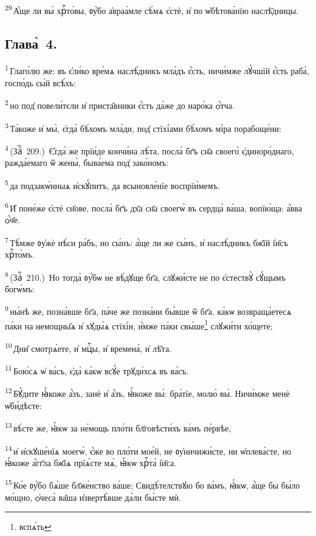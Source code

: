 \textsuperscript{29}\,А҆́ще ли вы̀ хрⷭ҇то́вы, ᲂу҆̀бо а҆враа́мле сѣ́мѧ є҆стѐ, и҆ по ѡ҆бѣтова́нїю наслѣ̑дницы.

\subsection{Глава̀~4.}

\textsuperscript{1}\,Глаго́лю же: въ є҆ли́ко вре́мѧ наслѣ́дникъ мла́дъ є҆́сть, ничи́мже лꙋ́чшїй є҆́сть раба̀, госпо́дь сы́й всѣ́хъ:

\textsuperscript{2}\,но под̾ повели́тєли и҆ приста̑вники є҆́сть да́же до наро́ка ѻ҆́тча.

\textsuperscript{3}\,Та́коже и҆ мы̀, є҆гда̀ бѣ́хомъ мла́ди, под̾ стїхі́ами бѣ́хомъ мі́ра порабоще́ни:

\textsuperscript{4}\,(Заⷱ҇~209.)~Є҆гда́ же прїи́де кончи́на лѣ́та, посла̀ бг҃ъ сн҃а своего̀ є҆диноро́днаго, ражда́емаго ѿ жены̀, быва́ема под̾ зако́номъ:

\textsuperscript{5}\,да подзакѡ́нныѧ и҆скꙋ́питъ, да всыновле́нїе воспрїи́мемъ.

\textsuperscript{6}\,И҆ поне́же є҆стѐ сн҃ове, посла̀ бг҃ъ дх҃а сн҃а своегѡ̀ въ сердца̀ ва́ша, вопїю́ща: а҆́вва ѻ҆́ч҃е.

\textsuperscript{7}\,Тѣ́мже ᲂу҆жѐ нѣ́си ра́бъ, но сы́нъ: а҆́ще ли же сы́нъ, и҆ наслѣ́дникъ бж҃їй і҆и҃съ хрⷭ҇то́мъ.

\textsuperscript{8}\,(Заⷱ҇~210.)~Но тогда̀ ᲂу҆́бѡ не вѣ́дꙋще бг҃а, слꙋжи́сте не по є҆стествꙋ̀ сꙋ́щымъ богѡ́мъ:

\textsuperscript{9}\,ны́нѣ же, позна́вше бг҃а, па́че же позна́ни бы́вше ѿ бг҃а, ка́кѡ возвраща́етесѧ па́ки на немощны̑ѧ и҆ хꙋды́ѧ стїхі́и, и҆̀мже па́ки свы́ше\footnote{вспѧ́ть} слꙋжи́ти хо́щете;

\textsuperscript{10}\,Дни̑ смотрѧ́ете, и҆ мцⷭ҇ы, и҆ времена̀, и҆ лѣ̑та.

\textsuperscript{11}\,Бою́сѧ ѡ҆ ва́съ, є҆да̀ ка́кѡ всꙋ́е трꙋди́хсѧ въ ва́съ.

\textsuperscript{12}\,Бꙋ́дите ꙗ҆́коже а҆́зъ, занѐ и҆ а҆́зъ, ꙗ҆́коже вы̀: бра́тїе, молю̀ вы̀. Ничи́мже менѐ ѡ҆би́дѣсте:

\textsuperscript{13}\,вѣ́сте же, ꙗ҆́кѡ за не́мощь пло́ти бл҃говѣсти́хъ ва́мъ пе́рвѣе,

\textsuperscript{14}\,и҆ и҆скꙋше́нїѧ моегѡ̀, є҆́же во пло́ти мое́й, не ᲂу҆ничижи́сте, ни ѡ҆плева́сте, но ꙗ҆́коже а҆́гг҃ла бж҃їѧ прїѧ́сте мѧ̀, ꙗ҆́кѡ хрⷭ҇та̀ і҆и҃са.

\textsuperscript{15}\,Ко́е ᲂу҆̀бо бѧ́ше бл҃же́нство ва́ше; Свидѣ́телствꙋю бо ва́мъ, ꙗ҆́кѡ, а҆́ще бы бы́ло мо́щно, ѻ҆чеса̀ ва̑ша и҆звертѣ́вше да́ли бы́сте мѝ.

